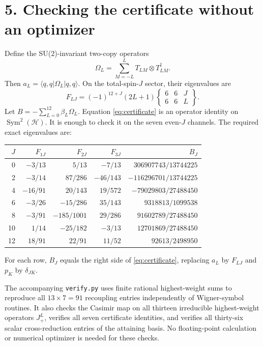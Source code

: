 \documentclass[11pt]{article}
\newcommand{\Sym}{\operatorname{Sym}}
\begin{document}
\section*{5. Checking the certificate without an optimizer}
Define the SU(2)-invariant two-copy operators
\[
 \Omega_L=\sum_{M=-L}^LT_{LM}\otimes T_{LM}^\dagger.
\]
Then $a_L=\langle q,q|\Omega_L|q,q\rangle$. On the total-spin-$J$ sector, their eigenvalues are
\begin{equation}
 F_{LJ}=(-1)^{12+J}(2L+1)
 \begin{Bmatrix}6&6&J\\6&6&L\end{Bmatrix}.
 \label{eq:sixj}
\end{equation}
Let $B=-\sum_{L=0}^{12}\beta_L\Omega_L$. Equation \eqref{eq:certificate} is an operator identity on $\Sym^2(\mathcal H)$. It is enough to check it on the seven even-$J$ channels. The required exact eigenvalues are:
\begin{center}
\small
\begin{tabular}{rrrrr}
\toprule
$J$ & $F_{1J}$ & $F_{2J}$ & $F_{3J}$ & $B_J$\\
\midrule
0 & $-3/13$ & $5/13$ & $-7/13$ & $306907743/13744225$\\
2 & $-3/14$ & $87/286$ & $-46/143$ & $-116296701/13744225$\\
4 & $-16/91$ & $20/143$ & $19/572$ & $-79029803/27488450$\\
6 & $-3/26$ & $-15/286$ & $35/143$ & $9318813/1099538$\\
8 & $-3/91$ & $-185/1001$ & $29/286$ & $91602789/27488450$\\
10 & $1/14$ & $-25/182$ & $-3/13$ & $12701869/27488450$\\
12 & $18/91$ & $22/91$ & $11/52$ & $92613/2498950$\\
\bottomrule
\end{tabular}
\end{center}
For each row, $B_J$ equals the right side of \eqref{eq:certificate}, replacing $a_L$ by $F_{LJ}$ and $p_K$ by $\delta_{JK}$.

The accompanying \texttt{verify.py} uses finite rational highest-weight sums to reproduce all $13\times7=91$ recoupling entries independently of Wigner-symbol routines. It also checks the Casimir map on all thirteen irreducible highest-weight operators $J_+^L$, verifies all seven certificate identities, and verifies all thirty-six scalar cross-reduction entries of the attaining basis. No floating-point calculation or numerical optimizer is needed for these checks.
\end{document}
